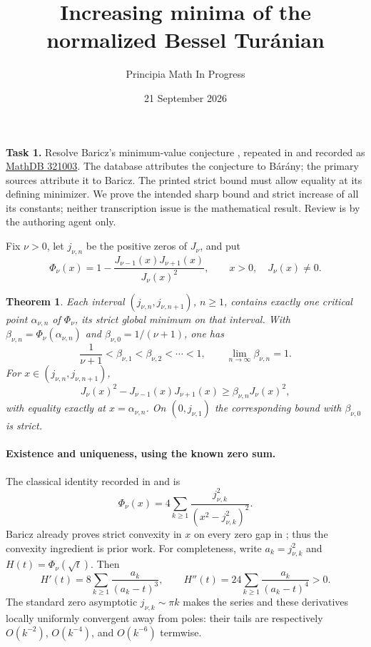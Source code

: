\documentclass[11pt]{article}
\title{Increasing minima of the normalized Bessel Tur\'anian}
\author{Principia Math In Progress}
\date{21 September 2026}
\newtheorem{theorem}{Theorem}
\begin{document}
\maketitle
\noindent\textbf{Task 1.} Resolve Baricz's minimum-value conjecture
\cite[Conjecture 4.2]{B}, repeated in \cite[Conjecture 2.3]{BP} and recorded as
\href{https://mathdb.com/p/321003}{MathDB 321003}.
The database attributes the conjecture to B\'ar\'any; the primary sources
attribute it to Baricz. The printed strict bound must allow equality at its
defining minimizer. We prove the intended sharp bound and strict increase
of all its constants; neither transcription issue is the mathematical result.
Review is by the authoring agent only.

Fix $\nu>0$, let $j_{\nu,n}$ be the positive zeros of $J_\nu$, and put
\[
 \Phi_\nu(x)=1-\frac{J_{\nu-1}(x)J_{\nu+1}(x)}{J_\nu(x)^2},
 \qquad x>0,\quad J_\nu(x)\ne0.
\]
\begin{theorem}
Each interval $(j_{\nu,n},j_{\nu,n+1})$, $n\ge1$, contains exactly one
critical point $\alpha_{\nu,n}$ of $\Phi_\nu$, its strict global minimum on
that interval. With $\beta_{\nu,n}=\Phi_\nu(\alpha_{\nu,n})$ and
$\beta_{\nu,0}=1/(\nu+1)$, one has
\[
 \frac1{\nu+1}<\beta_{\nu,1}<\beta_{\nu,2}<\cdots<1,
 \qquad \lim_{n\to\infty}\beta_{\nu,n}=1.
\]
For $x\in(j_{\nu,n},j_{\nu,n+1})$,
\[
 J_\nu(x)^2-J_{\nu-1}(x)J_{\nu+1}(x)
 \ge \beta_{\nu,n}J_\nu(x)^2,
\]
with equality exactly at $x=\alpha_{\nu,n}$. On $(0,j_{\nu,1})$ the
corresponding bound with $\beta_{\nu,0}$ is strict.
\end{theorem}

\paragraph{Existence and uniqueness, using the known zero sum.}
The classical identity recorded in \cite[Section 4.2]{B} and
\cite[Section 2.8]{BP} is
\begin{equation}\label{sum}
 \Phi_\nu(x)=4\sum_{k\ge1}\frac{j_{\nu,k}^2}{(x^2-j_{\nu,k}^2)^2}.
\end{equation}
Baricz already proves strict convexity in $x$ on every zero gap in
\cite[p.~262]{B}; thus the convexity ingredient is prior work.
For completeness, write $a_k=j_{\nu,k}^2$ and $H(t)=\Phi_\nu(\sqrt t)$.
Then
\begin{equation}\label{convex}
 H'(t)=8\sum_{k\ge1}\frac{a_k}{(a_k-t)^3},\qquad
 H''(t)=24\sum_{k\ge1}\frac{a_k}{(a_k-t)^4}>0.
\end{equation}
The standard zero asymptotic $j_{\nu,k}\sim\pi k$ makes the series and these
derivatives locally uniformly convergent away from poles: their tails are
respectively $O(k^{-2})$, $O(k^{-4})$, and $O(k^{-6})$ termwise.
\end{document}

